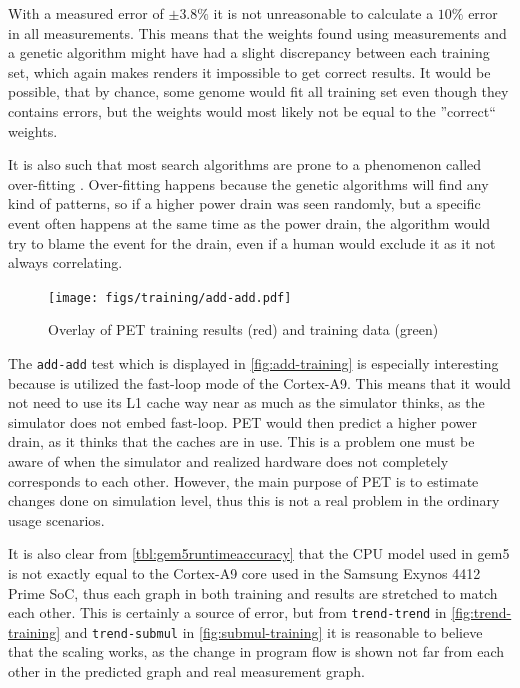 With a measured error of $\pm3.8\%$ it is not unreasonable to calculate a $10\%$ error in
all measurements. This means that the weights found using measurements and a genetic algorithm might
have had a slight discrepancy between each training set, which again makes renders it impossible to get
correct results. It would be possible, that by chance, some genome would fit all training set even though
they contains errors, but the weights would most likely not be equal to the ''correct`` weights.

It is also such that most search algorithms are prone to a phenomenon called
over-fitting \cite{russellnorvig}.  Over-fitting happens because the genetic
algorithms will find any kind of patterns, so if a higher power drain was seen
randomly, but a specific event often happens at the same time as the power
drain, the algorithm would try to blame the event for the drain, even if a human
would exclude it as it not always correlating.

\begin{figure}[ht]
\centering
\texttt{[image: figs/training/add-add.pdf]}
\caption{Overlay of PET training results (red) and training data (green)}
\label{fig:add-training}
\end{figure}

The \texttt{add-add} test which is displayed in \autoref{fig:add-training} is
especially interesting because is utilized the fast-loop mode of the Cortex-A9.
This means that it would not need to use its L1 cache way near as much as the
simulator thinks, as the simulator does not embed fast-loop. PET would then
predict a higher power drain, as it thinks that the caches are in use. This is
a problem one must be aware of when the simulator and realized hardware does not
completely corresponds to each other. However, the main purpose of PET is to
estimate changes done on simulation level, thus this is not a real problem in the
ordinary usage scenarios.

It is also clear from \autoref{tbl:gem5runtimeaccuracy} that the CPU model used
in gem5 is not exactly equal to the Cortex-A9 core used in the Samsung Exynos
4412 Prime SoC, thus each graph in both training and results are stretched to
match each other. This is certainly a source of error, but from
\texttt{trend-trend} in \autoref{fig:trend-training} and \texttt{trend-submul}
in \autoref{fig:submul-training} it is reasonable to believe that the scaling
works, as the change in program flow is shown not far from each other in the
predicted graph and real measurement graph.
